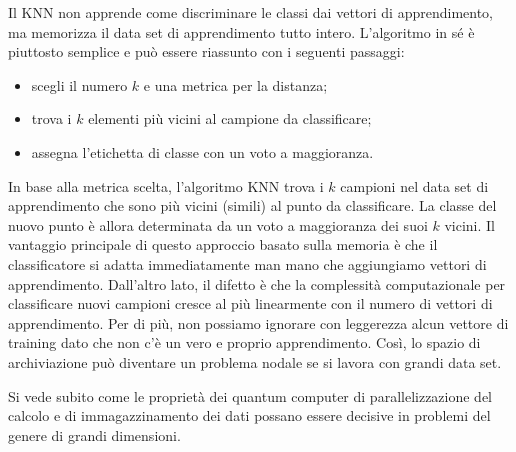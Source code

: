 Il \ac{KNN} non apprende come discriminare le classi dai vettori di 
apprendimento, ma memorizza il data set di apprendimento tutto intero. 
L'algoritmo in sé è piuttosto semplice e può essere riassunto con i 
seguenti passaggi: 
\begin{itemize}
    \item scegli il numero $k$ e una metrica per la distanza; 
    \item trova i $k$ elementi più vicini al campione da classificare; 
    \item assegna l'etichetta di classe con un voto a maggioranza. 
\end{itemize}

In base alla metrica scelta, l'algoritmo \ac{KNN} trova i $k$ campioni 
nel data set di apprendimento che sono più vicini (simili) al punto 
da classificare. La classe del nuovo punto è allora determinata da un 
voto a maggioranza dei suoi $k$ vicini. Il vantaggio principale di 
questo approccio basato sulla memoria è che il classificatore si 
adatta immediatamente man mano che aggiungiamo vettori di apprendimento. 
Dall'altro lato, il difetto è che la complessità computazionale per 
classificare nuovi campioni cresce al più linearmente con il numero di 
vettori di apprendimento. Per di più, non possiamo ignorare con leggerezza 
alcun vettore di training dato che non c'è un vero e proprio apprendimento. 
Così, lo spazio di archiviazione può diventare un problema nodale se si 
lavora con grandi data set. \cite{pml}

Si vede subito come le proprietà dei quantum computer di parallelizzazione 
del calcolo e di immagazzinamento dei dati possano essere decisive in 
problemi del genere di grandi dimensioni. 










